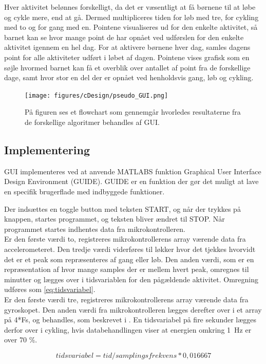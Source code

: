 Hver aktivitet belønnes forskelligt, da det er væsentligt at få børnene til at løbe og cykle mere, end at gå. Dermed multipliceres tiden for løb med tre, for cykling med to og for gang med en. Pointene visualiseres ud for den enkelte aktivitet, så barnet kan se hvor mange point de har opnået ved udførslen for den enkelte aktivitet igennem en hel dag. For at aktivere børnene hver dag, samles dagens point for alle aktiviteter udført i løbet af dagen. Pointene vises grafisk som en søjle hvormed barnet kan få et overblik over antallet af point fra de forskellige dage, samt hvor stor en del der er opnået ved henholdsvis gang, løb og cykling.  

\begin{figure}[H]
	\centering
	\texttt{[image: figures/cDesign/pseudo\_GUI.png]}
	\caption{På figuren ses et flowchart som gennemgår hvorledes resultaterne fra de forskellige algoritmer behandles af GUI.}
	\label{fig:GUI}
\end{figure}

\subsection{Implementering}
GUI implementeres ved at anvende MATLABS funktion Graphical User Interface Design Environment (GUIDE). GUIDE er en funktion der gør det muligt at lave en specifik brugerflade med indbyggede funktioner.

Der indsættes en toggle button med teksten START, og når der trykkes på knappen, startes programmet, og teksten bliver ændret til STOP. Når programmet startes indhentes data fra mikrokontrolleren. \\
Er den første værdi to, registreres mikrokontrollerens array værende data fra accelerometeret. Den tredje værdi viderføres til løkker hvor det tjekkes hvorvidt det er et peak som repræsenteres af gang eller løb. Den anden værdi, som er en repræsentation af hvor mange samples der er mellem hvert peak, omregnes til minutter og lægges over i tidsvariablen for den pågældende aktivitet. Omregning udføres som \eqref{eq:tidsvariabel}. \\
Er den første værdi tre, registreres mikrokontrollerens array værende data fra gyroskopet. Den anden værdi fra mikrokontrolleren lægges derefter over i et array på 4*Fs, og behandles, som beskrevet i . En tidsvariabel på fire sekunder lægges derfor over i cykling, hvis databehandlingen viser at energien omkring 1~Hz er over 70 \%. 

\begin{equation}
\label{eq:tidsvariabel}
	tidsvariabel = tid/samplingsfrekvens*0,016667
\end{equation}


